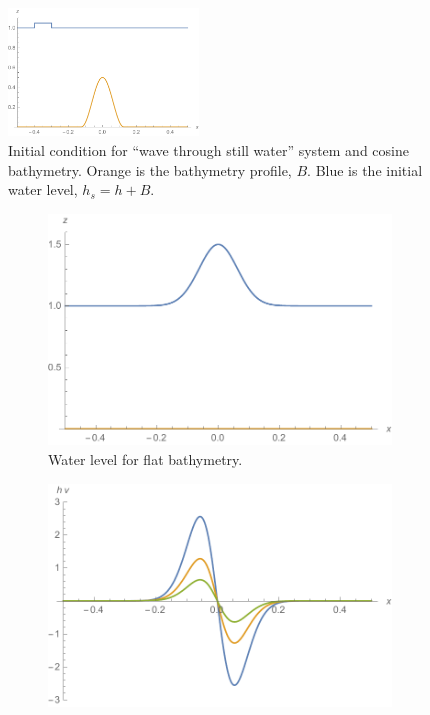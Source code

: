 \begin{figure}
  \centering
  \includegraphics[width=0.45\textwidth]{diagrams/init-wave}
  \caption{Initial condition for ``wave through still water'' system and cosine bathymetry. Orange is the bathymetry profile, $B$. Blue is the initial water level, $h_s = h + B$.}
  \label{fig:init_wave}
\end{figure}

\begin{figure}
  \centering
  \begin{subfigure}{0.45\textwidth}
    \includegraphics[width=\textwidth]{diagrams/init-geo-flat-h}
    \caption{Water level for flat bathymetry.}
    \label{fig:init-geo-flat-h}
  \end{subfigure}
  \begin{subfigure}{0.45\textwidth}
    \includegraphics[width=\textwidth]{diagrams/init-geo-flat-hv}

\end{subfigure}
\end{figure}
